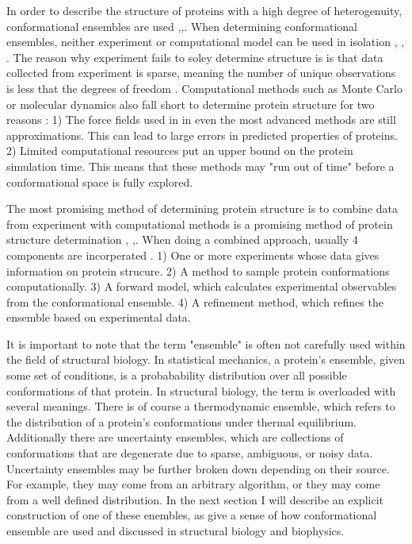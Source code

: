 \documentclass{article}
\begin{document}
In order to describe the structure of proteins with a high degree of heterogenuity, conformational ensembles are used \cite{lindorff-larsenSimultaneousDeterminationProtein2005},\cite{bonomiPrinciplesProteinStructural2017},\cite{thomasenConformationalEnsemblesIntrinsically2022}. 
When determining conformational ensembles, neither experiment or computational model can be used in isolation  \cite{bonomiPrinciplesProteinStructural2017}, \cite{lindorff-larsenSimultaneousDeterminationProtein2005}, \cite{schneidman-duhovnyUncertaintyIntegrativeStructural2014}. 
The reason why experiment fails to soley determine structure is is that data collected from experiment is sparse, meaning the number of unique observations is less that the degrees of freedom  \cite{schneidman-duhovnyUncertaintyIntegrativeStructural2014}. 
Computational methods such as Monte Carlo or molecular dynamics also fall short to determine protein structure for two reasons \cite{bonomiPrinciplesProteinStructural2017}:
1) The force fields used in in even the most advanced methods are still approximations. This can lead to large errors in predicted properties of proteins.
2) Limited computational resources put an upper bound on the protein simulation time.
    This means that these methods may "run out of time" before a conformational space is fully explored.
 
The most promising method of determining protein structure is to combine data from experiment with computational methods is a promising method of protein structure determination \cite{bonomiPrinciplesProteinStructural2017} ,\cite{thomasenConformationalEnsemblesIntrinsically2022} ,\cite{lindorff-larsenSimultaneousDeterminationProtein2005}.
When doing a combined approach, usually 4 components are incorperated \cite{thomasenConformationalEnsemblesIntrinsically2022}.
1) One or more experiments whose data gives information on protein strucure.
2) A method to sample protein conformations computationally.
3) A forward model, which calculates experimental observables from the conformational ensemble.
4) A refinement method, which refines the ensemble based on experimental data.

It is important to note that the term "ensemble" is often not carefully used within the field of structural biology.
In statistical mechanics, a protein's ensemble, given some set of conditions, is a probabability distribution over all possible conformations of that protein.
In structural biology, the term is overloaded with several meanings.\cite{gaalswykEmergingRolePhysical}
There is of course a thermodynamic ensemble, which refers to the distribution of a protein's conformations under thermal equilibrium.
Additionally there are uncertainty ensembles, which are collections of conformations that are degenerate due to sparse, ambiguous, or noisy data.
Uncertainty ensembles may be further broken down depending on their source.
For example, they may come from an arbitrary algorithm, or they may come from a well defined distribution.\cite{gaalswykEmergingRolePhysical}
In the next section I will describe an explicit construction of one of these enembles, as give a sense of how conformational ensemble are used and discussed in structural biology and biophysics. 
\end{document}
